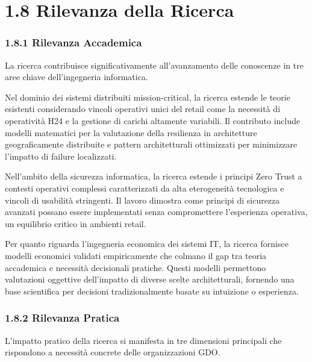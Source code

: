 \documentclass{report}
\begin{document}
\section{\texorpdfstring{\textbf{1.8 Rilevanza della
Ricerca}}{1.8 Rilevanza della Ricerca}}\label{rilevanza-della-ricerca}

\subsubsection{\texorpdfstring{\textbf{1.8.1 Rilevanza
Accademica}}{1.8.1 Rilevanza Accademica}}\label{rilevanza-accademica}

La ricerca contribuisce significativamente all'avanzamento delle
conoscenze in tre aree chiave dell'ingegneria informatica.

Nel dominio dei sistemi distribuiti mission-critical, la ricerca estende
le teorie esistenti considerando vincoli operativi unici del retail come
la necessità di operatività H24 e la gestione di carichi altamente
variabili. Il contributo include modelli matematici per la valutazione
della resilienza in architetture geograficamente distribuite e pattern
architetturali ottimizzati per minimizzare l'impatto di failure
localizzati.

Nell'ambito della sicurezza informatica, la ricerca estende i principi
Zero Trust a contesti operativi complessi caratterizzati da alta
eterogeneità tecnologica e vincoli di usabilità stringenti. Il lavoro
dimostra come principi di sicurezza avanzati possano essere implementati
senza compromettere l'esperienza operativa, un equilibrio critico in
ambienti retail.

Per quanto riguarda l'ingegneria economica dei sistemi IT, la ricerca
fornisce modelli economici validati empiricamente che colmano il gap tra
teoria accademica e necessità decisionali pratiche. Questi modelli
permettono valutazioni oggettive dell'impatto di diverse scelte
architetturali, fornendo una base scientifica per decisioni
tradizionalmente basate su intuizione o esperienza.

\subsubsection{\texorpdfstring{\textbf{1.8.2 Rilevanza
Pratica}}{1.8.2 Rilevanza Pratica}}\label{rilevanza-pratica}

L'impatto pratico della ricerca si manifesta in tre dimensioni
principali che rispondono a necessità concrete delle organizzazioni GDO.
\end{document}
